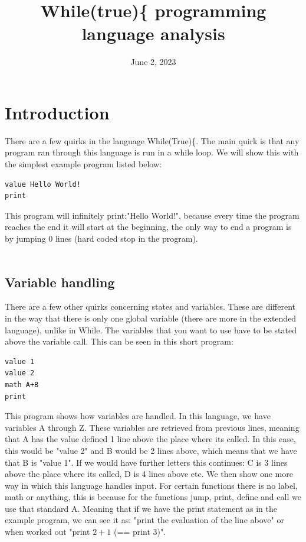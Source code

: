 \documentclass{article}
\title{While(true)\{ programming language analysis}
\date{June 2, 2023}
\begin{document}
\maketitle
\tableofcontents


\section{Introduction}
There are a few quirks in the language While(True)\{. The main quirk is that any program ran through this language is run in a while loop. We will show this with the simplest example program listed below:
\begin{verbatim}
value Hello World!
print
\end{verbatim}
This program will infinitely print:"Hello World!", because every time the program reaches the end it will start at the beginning, the only way to end a program is by jumping 0 lines (hard coded stop in the program).\\\\
\subsection{Variable handling}
There are a few other quirks concerning states and variables. These are different in the way that there is only one global variable (there are more in the extended language), unlike in While. The variables that you want to use have to be stated above the variable call. This can be seen in this short program:
\begin{verbatim}
value 1
value 2
math A+B   
print
\end{verbatim}

This program shows how variables are handled. In this language, we have variables A through Z. These variables are retrieved from previous lines, meaning that A has the value defined 1 line above the place where its called. In this case, this would be "value 2" and B would be 2 lines above, which means that we have that B is "value 1". If we would have further letters this continues: C is 3 lines above the place where its called, D is 4 lines above etc. We then show one more way in which this language handles input. For certain functions there is no label, math or anything, this is because for the functions jump, print, define and call we use that standard A. Meaning that if we have the print statement as in the example program, we can see it as: "print the evaluation of the line above" or when worked out "print $2+1$ (== print 3)".\\\\
\end{document}
